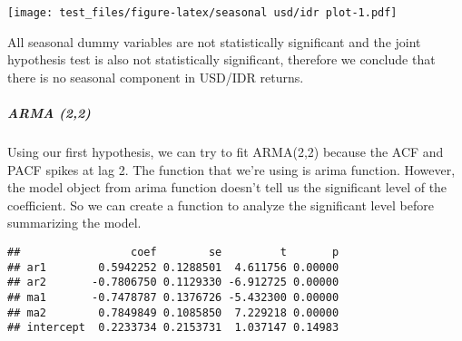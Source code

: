 \documentclass[]{article}
\newenvironment{Shaded}{\begin{snugshade}}{\end{snugshade}}
\newcommand{\KeywordTok}[1]{\textcolor[rgb]{0.13,0.29,0.53}{\textbf{#1}}}
\newcommand{\DataTypeTok}[1]{\textcolor[rgb]{0.13,0.29,0.53}{#1}}
\newcommand{\DecValTok}[1]{\textcolor[rgb]{0.00,0.00,0.81}{#1}}
\newcommand{\StringTok}[1]{\textcolor[rgb]{0.31,0.60,0.02}{#1}}
\newcommand{\CommentTok}[1]{\textcolor[rgb]{0.56,0.35,0.01}{\textit{#1}}}
\newcommand{\OtherTok}[1]{\textcolor[rgb]{0.56,0.35,0.01}{#1}}
\newcommand{\ControlFlowTok}[1]{\textcolor[rgb]{0.13,0.29,0.53}{\textbf{#1}}}
\newcommand{\OperatorTok}[1]{\textcolor[rgb]{0.81,0.36,0.00}{\textbf{#1}}}
\newcommand{\NormalTok}[1]{#1}
\let\oldsubparagraph\subparagraph
\renewcommand{\subparagraph}[1]{\oldsubparagraph{#1}\mbox{}}
\begin{document}
\texttt{[image: test\_files/figure-latex/seasonal usd/idr plot-1.pdf]}

All seasonal dummy variables are not statistically significant and the
joint hypothesis test is also not statistically significant, therefore
we conclude that there is no seasonal component in USD/IDR returns.

\subparagraph{ARMA (2,2)}\label{arma-22}

Using our first hypothesis, we can try to fit ARMA(2,2) because the ACF
and PACF spikes at lag 2. The function that we're using is arima
function. However, the model object from arima function doesn't tell us
the significant level of the coefficient. So we can create a function to
analyze the significant level before summarizing the model.

\begin{Shaded}
\end{Shaded}

\begin{verbatim}
##                 coef        se         t       p
## ar1        0.5942252 0.1288501  4.611756 0.00000
## ar2       -0.7806750 0.1129330 -6.912725 0.00000
## ma1       -0.7478787 0.1376726 -5.432300 0.00000
## ma2        0.7849849 0.1085850  7.229218 0.00000
## intercept  0.2233734 0.2153731  1.037147 0.14983
\end{verbatim}
\end{document}
